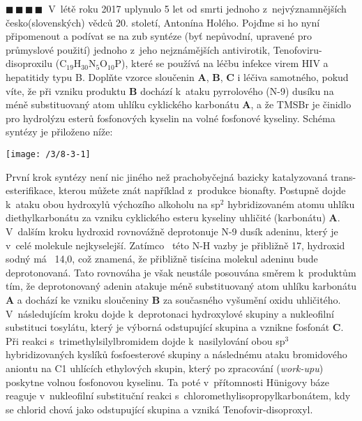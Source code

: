 \documentclass{book}
\newcommand{\ctyri}{$\blacksquare \, \blacksquare \, \blacksquare \, \blacksquare \; \; $}
\renewenvironment{quotation}{\par}{\par} %
\begin{document}
\hrulefill %
\begin{quotation}
\ctyri V~létě roku 2017 uplynulo 5 let od smrti jednoho z~nejvýznamnějších česko(slovenských) vědců 20. století, Antonína Holého. Pojďme si ho
nyní připomenout a podívat se na zub syntéze (byť nepůvodní, upravené
pro průmyslové použití) jednoho z~jeho nejznámějších antivirotik,
Tenofoviru-disoproxilu (C$_{19}$H$_{30}$N$_{5}$O$_{10}$P), které
se používá na léčbu infekce virem HIV a hepatitidy typu B. Doplňte
vzorce sloučenin \textbf{A}, \textbf{B}, \textbf{C} i léčiva samotného, pokud víte,
že při vzniku produktu \textbf{B} dochází k~ataku pyrrolového (N-9)
dusíku na méně substituovaný atom uhlíku cyklického karbonátu \textbf{A},
a že TMSBr je činidlo pro hydrolýzu esterů fosfonových kyselin na
volné fosfonové kyseliny. Schéma syntézy je přiloženo níže:

\begin{center}
\texttt{[image: /3/8-3-1]}
\end{center}
\end{quotation} \dotfill \par 
První krok syntézy není nic jiného než prachobyčejná bazicky katalyzovaná
trans-esterifikace, kterou můžete znát například z~produkce bionafty.
Postupně dojde k~ataku obou hydroxylů výchozího alkoholu na sp$^{2}$
hybridizovaném atomu uhlíku diethylkarbonátu za vzniku cyklického
esteru kyseliny uhličité (karbonátu) \textbf{A}. V~dalším kroku hydroxid
rovnovážně deprotonuje N-9 dusík adeninu, který je v~celé molekule
nejkyselejší. Zatímco \pKa\ této N-H vazby je přibližně 17, hydroxid
sodný má \pKa\ 14,0, což znamená, že přibližně tisícina
molekul adeninu bude deprotonovaná. Tato rovnováha je však neustále
posouvána směrem k~produktům tím, že deprotonovaný adenin atakuje
méně substituovaný atom uhlíku karbonátu \textbf{A} a dochází ke vzniku
sloučeniny \textbf{B} za současného vyšumění oxidu uhličitého. V~následujícím
kroku dojde k~deprotonaci hydroxylové skupiny a nukleofilní substituci
tosylátu, který je výborná odstupující skupina a vznikne fosfonát
\textbf{C}. Při reakci s~trimethylsilyl\-bromidem dojde k~nasilylování
obou sp$^{3}$ hybridizovaných kyslíků fosfoesterové skupiny a následnému
ataku bromidového aniontu na C1 uhlících ethylových skupin, který
po zpracování (\textit{work-upu}) poskytne volnou fosfonovou kyselinu.
Ta poté v~přítomnosti Hünigovy báze reaguje v~nukleofilní substituční reakci s~chloromethyl\-isopropyl\-karbonátem, kdy se chlorid chová jako odstupující skupina
a vzniká Tenofovir-disoproxyl. 
\end{document}
